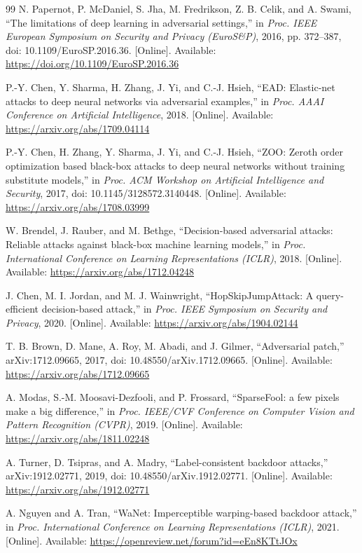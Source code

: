 ﻿\documentclass[6p,10pt,times]{ieeeaccess}
\begin{document}
\begin{thebibliography}{99}
N. Papernot, P. McDaniel, S. Jha, M. Fredrikson, Z. B. Celik, and A. Swami, ``The limitations of deep learning in adversarial settings,'' in \emph{Proc. IEEE European Symposium on Security and Privacy (EuroS\&P)}, 2016, pp. 372--387, doi: 10.1109/EuroSP.2016.36. [Online]. Available: \url{https://doi.org/10.1109/EuroSP.2016.36}

P.-Y. Chen, Y. Sharma, H. Zhang, J. Yi, and C.-J. Hsieh, ``EAD: Elastic-net attacks to deep neural networks via adversarial examples,'' in \emph{Proc. AAAI Conference on Artificial Intelligence}, 2018. [Online]. Available: \url{https://arxiv.org/abs/1709.04114}

P.-Y. Chen, H. Zhang, Y. Sharma, J. Yi, and C.-J. Hsieh, ``ZOO: Zeroth order optimization based black-box attacks to deep neural networks without training substitute models,'' in \emph{Proc. ACM Workshop on Artificial Intelligence and Security}, 2017, doi: 10.1145/3128572.3140448. [Online]. Available: \url{https://arxiv.org/abs/1708.03999}

W. Brendel, J. Rauber, and M. Bethge, ``Decision-based adversarial attacks: Reliable attacks against black-box machine learning models,'' in \emph{Proc. International Conference on Learning Representations (ICLR)}, 2018. [Online]. Available: \url{https://arxiv.org/abs/1712.04248}

J. Chen, M. I. Jordan, and M. J. Wainwright, ``HopSkipJumpAttack: A query-efficient decision-based attack,'' in \emph{Proc. IEEE Symposium on Security and Privacy}, 2020. [Online]. Available: \url{https://arxiv.org/abs/1904.02144}

T. B. Brown, D. Mane, A. Roy, M. Abadi, and J. Gilmer, ``Adversarial patch,'' arXiv:1712.09665, 2017, doi: 10.48550/arXiv.1712.09665. [Online]. Available: \url{https://arxiv.org/abs/1712.09665}

A. Modas, S.-M. Moosavi-Dezfooli, and P. Frossard, ``SparseFool: a few pixels make a big difference,'' in \emph{Proc. IEEE/CVF Conference on Computer Vision and Pattern Recognition (CVPR)}, 2019. [Online]. Available: \url{https://arxiv.org/abs/1811.02248}

A. Turner, D. Tsipras, and A. Madry, ``Label-consistent backdoor attacks,'' arXiv:1912.02771, 2019, doi: 10.48550/arXiv.1912.02771. [Online]. Available: \url{https://arxiv.org/abs/1912.02771}

A. Nguyen and A. Tran, ``WaNet: Imperceptible warping-based backdoor attack,'' in \emph{Proc. International Conference on Learning Representations (ICLR)}, 2021. [Online]. Available: \url{https://openreview.net/forum?id=eEn8KTtJOx}


\end{thebibliography}
\end{document}
